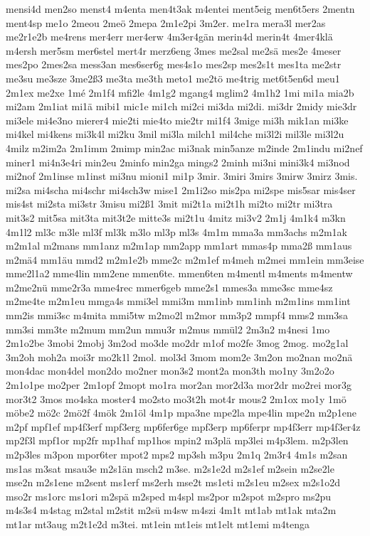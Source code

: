 {mensi4d
men2so
menst4
m4enta
men4t3ak
m4entei
ment5eig
men6t5ers
2mentn
ment4sp
me1o
2meou
2meö
2mepa
2m1e2pi
3m2er.
me1ra
mera3l
mer2as
me2r1e2b
me4rens
mer4err
mer4erw
4m3er4gän
merin4d
merin4t
4mer4klä
m4ersh
mer5sm
mer6stel
mert4r
merz6eng
3mes
me2sal
me2sä
mes2e
4meser
mes2po
2mes2sa
mess3an
mes6ser6g
mes4s1o
mes2sp
mes2s1t
mes1ta
me2str
me3su
me3sze
3me2ß3
me3ta
me3th
meto1
me2tö
me4trig
met6t5en6d
meu1
2m1ex
me2xe
1mé
2m1f4
mfi2le
4m1g2
mgang4
mglim2
4m1h2
1mi
mi1a
mia2b
mi2am
2m1iat
mi1ä
mibi1
mic1e
mi1ch
mi2ci
mi3da
mi2di.
mi3dr
2midy
mie3dr
mi3ele
mi4e3no
mierer4
mie2ti
mie4to
mie2tr
mi1f4
3mige
mi3h
mik1an
mi3ke
mi4kel
mi4kens
mi3k4l
mi2ku
3mil
mi3la
milch1
mil4che
mi3l2i
mil3le
mi3l2u
4milz
m2im2a
2m1imm
2mimp
min2ac
mi3nak
min5anze
m2inde
2m1indu
mi2nef
miner1
mi4n3e4ri
min2eu
2minfo
min2ga
mings2
2minh
mi3ni
mini3k4
mi3nod
mi2nof
2m1inse
m1inst
mi3nu
mioni1
mi1p
3mir.
3miri
3mirs
3mirw
3mirz
3mis.
mi2sa
mi4scha
mi4schr
mi4sch3w
mise1
2m1i2so
mis2pa
mi2spe
mis5sar
mis4ser
mis4st
mi2sta
mi3str
3misu
mi2ß1
3mit
mi2t1a
mi2t1h
mi2to
mi2tr
mi3tra
mit3s2
mit5sa
mit3ta
mit3t2e
mitte3s
mi2t1u
4mitz
mi3v2
2m1j
4m1k4
m3kn
4m1l2
ml3c
m3le
ml3f
ml3k
m3lo
ml3p
ml3s
4m1m
mma3a
mm3achs
m2m1ak
m2m1al
m2mans
mm1anz
m2m1ap
mm2app
mm1art
mmas4p
mma2ß
mm1aus
m2mä4
mm1äu
mmd2
m2m1e2b
mme2c
m2m1ef
m4meh
m2mei
mm1ein
mm3eise
mme2l1a2
mme4lin
mm2ene
mmen6te.
mmen6ten
m4mentl
m4ments
m4mentw
m2me2nü
mme2r3a
mme4rec
mmer6geb
mme2s1
mmes3a
mme3sc
mme4sz
m2me4te
m2m1eu
mmga4s
mmi3el
mmi3m
mm1inb
mm1inh
m2m1ins
mm1int
mm2is
mmi3sc
m4mita
mmi5tw
m2mo2l
m2mor
mm3p2
mmpf4
mms2
mm3sa
mm3si
mm3te
m2mum
mm2un
mmu3r
m2mus
mmül2
2m3n2
m4nesi
1mo
2m1o2be
3mobi
2mobj
3m2od
mo3de
mo2dr
m1of
mo2fe
3mog
2mog.
mo2g1al
3m2oh
moh2a
moi3r
mo2k1l
2mol.
mol3d
3mom
mom2e
3m2on
mo2nan
mo2nä
mon4dac
mon4del
mon2do
mo2ner
mon3s2
mont2a
mon3th
mo1ny
3m2o2o
2m1o1pe
mo2per
2m1opf
2mopt
mo1ra
mor2an
mor2d3a
mor2dr
mo2rei
mor3g
mor3t2
3mos
mo4ska
moster4
mo2sto
mo3t2h
mot4r
mous2
2m1ox
mo1y
1mö
möbe2
mö2c
2mö2f
4mök
2m1öl
4m1p
mpa3ne
mpe2la
mpe4lin
mpe2n
m2p1ene
m2pf
mpf1ef
mp4f3erf
mpf3erg
mp6fer6ge
mpf3erp
mp6ferpr
mp4f3err
mp4f3er4z
mp2f3l
mpf1or
mp2fr
mp1haf
mp1hos
mpin2
m3plä
mp3lei
m4p3lem.
m2p3len
m2p3les
m3pon
mpor6ter
mpot2
mps2
mp3sh
m3pu
2m1q
2m3r4
4m1s
m2san
ms1as
m3sat
msau3e
m2s1än
msch2
m3se.
m2s1e2d
m2s1ef
m2sein
m2se2le
mse2n
m2s1ene
m2sent
ms1erf
ms2erh
mse2t
ms1eti
m2s1eu
m2sex
m2s1o2d
mso2r
ms1orc
ms1ori
m2spä
m2sped
m4spl
ms2por
m2spot
m2spro
ms2pu
m4s3s4
m4stag
m2stal
m2stit
m2sü
m4sw
m4szi
4m1t
mt1ab
mt1ak
mta2m
mt1ar
mt3aug
m2t1e2d
m3tei.
mt1ein
mt1eis
mt1elt
mt1emi
m4tenga
}
